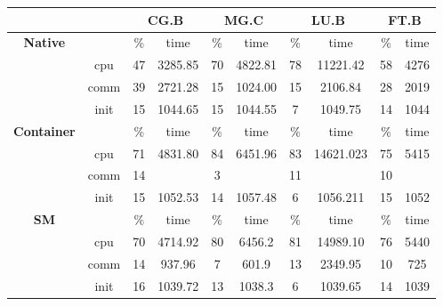 \begin{tabular}{ |c|c|c|c|c|c|c|c|c|c|}
\hline
&  & \multicolumn{2}{|c|}{{\bf CG.B}} & \multicolumn{2}{|c|}{{\bf MG.C}} & \multicolumn{2}{|c|}{{\bf LU.B}} & \multicolumn{2}{|c|}{{\bf FT.B}}\\
\hline
\multirow{3}{*}{{\bf Native}} & & \% & time& \% & time& \% & time& \% & time\\
\cline{2-10}
& cpu& 47 & 3285.85& 70 & 4822.81& 78 & 11221.42& 58 & 4276\\
& comm& 39 & 2721.28& 15 & 1024.00& 15 & 2106.84& 28 & 2019\\
& init& 15 & 1044.65& 15 & 1044.55& 7 & 1049.75& 14 & 1044\\
\hline \hline
\multirow{3}{*}{{\bf Container}} & & \% & time& \% & time& \% & time& \% & time\\
\cline{2-10}
& cpu& 71 & 4831.80& 84 & 6451.96& 83 & 14621.023& 75 & 5415\\
& comm& 14 & \color{blue}{934.52} & 3 & \color{blue}{206.01} & 11 & \color{blue}{2014.92} & 10 & \color{blue}{722}\\
& init& 15 & 1052.53& 14 & 1057.48& 6 & 1056.211& 15 & 1052\\
\hline \hline
\multirow{3}{*}{{\bf SM}} & & \% & time& \% & time& \% & time& \% & time\\
\cline{2-10}
& cpu& 70 & 4714.92& 80 & 6456.2& 81 & 14989.10& 76 & 5440\\
& comm& 14 & 937.96& 7 & 601.9& 13 & 2349.95& 10 & 725\\
& init& 16 & 1039.72& 13 & 1038.3& 6 & 1039.65& 14 & 1039\\
\hline
\end{tabular}
